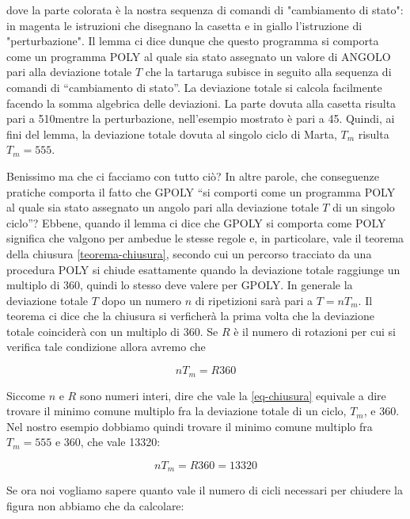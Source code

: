 dove la parte colorata è la nostra sequenza di comandi di "cambiamento di stato": in magenta le istruzioni che disegnano la casetta e in giallo l'istruzione di "perturbazione". Il lemma ci dice dunque che questo programma si comporta come un programma POLY al quale sia stato assegnato un valore di ANGOLO pari alla deviazione totale $T$ che la tartaruga subisce in seguito alla sequenza di comandi di ``cambiamento di stato''. La deviazione totale si calcola facilmente facendo la somma algebrica delle deviazioni. La parte dovuta alla casetta risulta pari a 510\degree mentre la perturbazione, nell'esempio mostrato è pari a 45\degree. Quindi, ai fini del lemma, la deviazione totale dovuta al singolo ciclo di Marta, $T_m$ risulta $T_m=555$.

Benissimo ma che ci facciamo con tutto ciò? In altre parole, che conseguenze pratiche comporta il fatto che GPOLY  ``si comporti come un programma POLY al quale sia stato assegnato un angolo pari alla deviazione totale $T$ di un singolo ciclo''? Ebbene, quando il lemma ci dice che GPOLY si comporta come POLY significa che valgono per ambedue le stesse regole e, in particolare, vale il teorema della chiusura \ref{teorema-chiusura}, secondo cui un percorso tracciato da una procedura POLY si chiude esattamente quando la deviazione totale raggiunge un multiplo di 360\degree, quindi lo stesso deve valere per GPOLY. In generale la deviazione totale $T$ dopo un numero $n$ di ripetizioni sarà pari a $T=n T_m$. Il teorema ci dice che la chiusura si verficherà la prima volta che la deviazione totale coinciderà con un multiplo di 360\degree. Se $R$ è il numero di rotazioni per cui si verifica tale condizione allora avremo che 

\begin{equation}
\label{eq-chiusura}
nT_m=R360
\end{equation}

Siccome $n$ e $R$ sono numeri interi, dire che vale la \ref{eq-chiusura} equivale a dire trovare il minimo comune multiplo fra la deviazione totale di un ciclo, $T_m$, e 360. Nel nostro esempio dobbiamo quindi trovare il minimo comune multiplo fra $T_m=555$ e 360, che vale 13320:

\begin{equation}
\label{eq-chiusura-3}
nT_m=R360=13320
\end{equation}

Se ora noi vogliamo sapere quanto vale il numero di cicli necessari per chiudere la figura non abbiamo che da calcolare:

